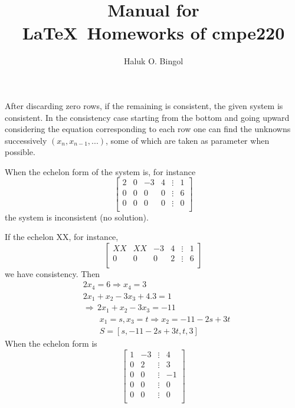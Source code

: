\documentclass[11pt]{amsbook}
\title{
	Manual for\\
	\LaTeX\ Homeworks of cmpe220\\
	{\footnotesize \hbTimeStamp}
}
\author{Haluk O. Bingol}
\date{}                                           %
\begin{document}

After discarding zero rows, if the remaining is consistent, the given system is consistent. In the consistency case starting from the bottom and going upward considering the equation corresponding to each row one can find the unknowns successively $(x_{n},  x_{n-1}, ... )$, some of which are taken as parameter when possible.\par
When the echelon form of the system is, for instance
\[
 \begin{bmatrix}
    2 & 0 & -3 &  4 & \vdots & 1 \\
    0 & 0 & 0 &  0 & \vdots & 6 \\
    0 & 0 & 0 &  0 & \vdots & 0 \\
\end{bmatrix}
\]
the system is inconsistent (no solution). \par
If the echelon XX, for instance,
\[
 \begin{bmatrix}
    XX  & XX & -3 &  4 & \vdots & 1 \\
    0 & 0 & 0 & 2 & \vdots & 6 \\
\end{bmatrix}
\]
we have consistency. Then
\begin{align*}
&2x_{4} = 6 \Rightarrow x_{4} = 3 \\
&2x_{1} + x_{2} - 3x_{3} + 4.3 = 1 \\
&\Rightarrow \, 2x_{1} + x_{2} - 3x_{3} = -11 \\
&\qquad x_{1} = s, x_{3} = t \Rightarrow  x_{2} = -11 -2s + 3t \\
&\qquad S = [s, -11 - 2s + 3t, t, 3]
\end{align*}
When the echelon form is
\[
 \begin{bmatrix}
 1 & -3 & \vdots & 4 \\
 0 & 2 & \vdots & 3 \\
 0 & 0 & \vdots & -1 \\
 0 & 0 & \vdots & 0 \\
 0 & 0 & \vdots & 0 \\
\end{bmatrix}
\]
\end{document}
